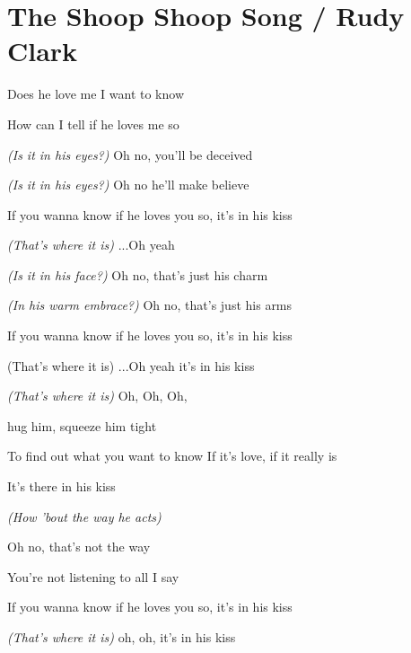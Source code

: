 \section{The Shoop Shoop Song / Rudy Clark}\label{sec:shoop_shoop_song}
\Cmajor
\Fmajor
\Gmajor
\Aminor
\Dminor
\Dseven
\Eseven


Does he love me I want to know

How can I tell if he loves me so

\emph{(Is it in his eyes?)} Oh no, you'll be deceived

\emph{(Is it in his eyes?)} Oh no he'll make believe

If you wanna know if he loves you so, it's in his kiss

\emph{(That's where it is)} ...Oh yeah

\emph{(Is it in his face?)} Oh no, that's just his charm

\emph{(In his warm embrace?)} Oh no, that's just his arms

If you wanna know if he loves you so, it's in his kiss 

(That's where it is) ...Oh yeah it's in his kiss

\emph{(That's where it is)} Oh, Oh, Oh,

hug him, squeeze him tight

To find out what you want to know If it's love, if it really is

It's there in his kiss

\emph{(How 'bout the way he acts)}

Oh no, that's not the way

You're not listening to all I say

If you wanna know if he loves you so, it's in his kiss

\emph{(That's where it is)} oh, oh, it's in his kiss

